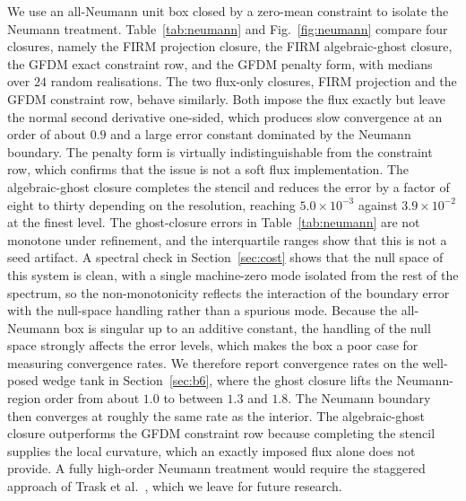 \documentclass[preprint,review,12pt]{elsarticle}
\begin{document}
We use an all-Neumann unit box closed by a zero-mean constraint to isolate the Neumann treatment.
Table~\ref{tab:neumann} and Fig.~\ref{fig:neumann} compare four closures, namely the FIRM projection closure, the FIRM algebraic-ghost closure, the GFDM exact constraint row, and the GFDM penalty form, with medians over $24$ random realisations.
The two flux-only closures, FIRM projection and the GFDM constraint row, behave similarly.
Both impose the flux exactly but leave the normal second derivative one-sided, which produces slow convergence at an order of about $0.9$ and a large error constant dominated by the Neumann boundary.
The penalty form is virtually indistinguishable from the constraint row, which confirms that the issue is not a soft flux implementation.
The algebraic-ghost closure completes the stencil and reduces the error by a factor of eight to thirty depending on the resolution, reaching $5.0\times10^{-3}$ against $3.9\times10^{-2}$ at the finest level.
The ghost-closure errors in Table~\ref{tab:neumann} are not monotone under refinement, and the interquartile ranges show that this is not a seed artifact.
A spectral check in Section~\ref{sec:cost} shows that the null space of this system is clean, with a single machine-zero mode isolated from the rest of the spectrum, so the non-monotonicity reflects the interaction of the boundary error with the null-space handling rather than a spurious mode.
Because the all-Neumann box is singular up to an additive constant, the handling of the null space strongly affects the error levels, which makes the box a poor case for measuring convergence rates.
We therefore report convergence rates on the well-posed wedge tank in Section~\ref{sec:b6}, where the ghost closure lifts the Neumann-region order from about $1.0$ to between $1.3$ and $1.8$.
The Neumann boundary then converges at roughly the same rate as the interior.
The algebraic-ghost closure outperforms the GFDM constraint row because completing the stencil supplies the local curvature, which an exactly imposed flux alone does not provide.
A fully high-order Neumann treatment would require the staggered approach of Trask et al.~\cite{Trask2017}, which we leave for future research.
\end{document}
